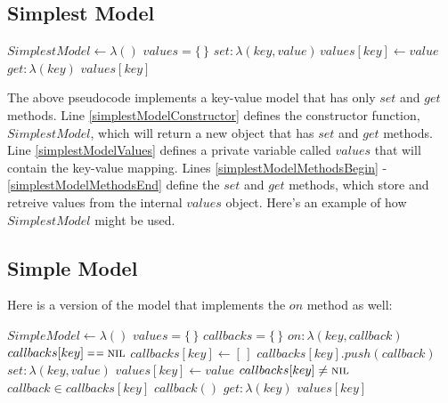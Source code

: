 \subsection{Simplest Model}

\begin{codebox}
\li $SimplestModel \gets \lambda()$ \label{simplestModelConstructor}
\Do
  \li $values = \{\,\}$ \label{simplestModelValues}
  \li \Return \label{simplestModelMethodsBegin}
  \Do
    \li $set: \lambda(key, value) \, values[key] \gets value$
    \li $get: \lambda(key)$ \Return $values[key]$ \label{simplestModelMethodsEnd}
  \End
\End
\end{codebox}

The above pseudocode implements a key-value model that has only $set$ and $get$ methods. Line \ref{simplestModelConstructor} defines the constructor function, $SimplestModel$, which will return a new object that has $set$ and $get$ methods. Line \ref{simplestModelValues} defines a private variable called $values$ that will contain the key-value mapping. Lines \ref{simplestModelMethodsBegin} - \ref{simplestModelMethodsEnd} define the $set$ and $get$ methods, which store and retreive values from the internal $values$ object. Here's an example of how $SimplestModel$ might be used.


\subsection{Simple Model}
Here is a version of the model that implements the $on$ method as well:

\begin{codebox}
\li $SimpleModel \gets \lambda()$ \label{simpleModelConstructor}
\Do
  \li $values = \{\,\}$ \label{simpleModelValues}
  \li $callbacks = \{\,\}$ \label{simpleModelCallbacks}
  \li \Return \label{simpleModelMethodsBegin}
  \Do
    \li $on: \lambda(key, callback)$ \label{simpleModelOn}
    \Do
      \li \If $callbacks[key] \isequal \const{nil}$
      \Do
        \li $callbacks[key] \gets [\,]$
      \End
      \li $callbacks[key].push(callback)$
    \End
    \li $set: \lambda(key, value)$
    \Do
      \li $values[key] \gets value$
      \li \If $callbacks[key] \neq \textnormal{\scshape nil}$
      \Do
        \li \For $callback \in callbacks[key]$
        \Do
          \li $callback()$
        \End  
      \End
    \End
    \li $get: \lambda(key)$ \Return $values[key]$
  \End
\End
\end{codebox}

